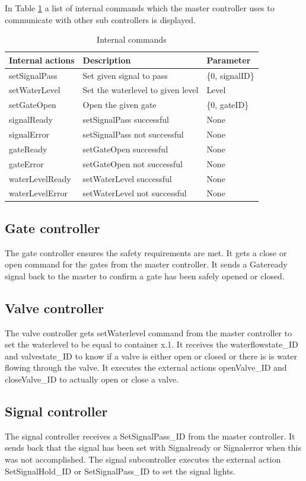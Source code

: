 \noindent In Table \ref{tab:internal} a list of internal commands which the master controller uses to communicate with other sub controllers is displayed.

\begin{table}[htbp]
	\centering
	\begin{tabular}{lll}
		\toprule
		\textbf{Internal actions} & \textbf{Description} & \textbf{Parameter} \\
		\midrule
		setSignalPass & Set given signal to pass & \{0, signalID\} \\
		setWaterLevel & Set the waterlevel to given level & Level\\
		setGateOpen & Open the given gate & \{0, gateID\} \\
		signalReady & setSignalPass successful & None\\
		signalError & setSignalPass not successful & None \\
		gateReady & setGateOpen successful & None\\
		gateError & setGateOpen not successful & None\\
		waterLevelReady & setWaterLevel successful & None\\
		waterLevelError & setWaterLevel not successful & None\\
		\bottomrule
	\end{tabular}%
	\caption{Internal commands}
	\label{tab:internal}%
\end{table}%

\subsection{Gate controller}
The gate controller ensures the safety requirements are met. It gets a close or open command for the gates from the master controller. It sends a Gateready signal back to the master to confirm a gate has been safely opened or closed. 
\subsection{Valve controller}
The valve controller gets setWaterlevel command from the master controller to set the waterlevel to be equal to container x.1. It receives the waterflowstate\_ID and valvestate\_ID to know if a valve is either open or closed or there is is water flowing through the valve. It executes the external actions openValve\_ID and closeValve\_ID to actually open or close a valve.  
\subsection{Signal controller}
The signal controller receives a SetSignalPass\_ID from the master controller. It sends back that the signal has been set with Signalready or Signalerror when this was not accomplished. The signal subcontroller executes the external action SetSignalHold\_ID or SetSignalPass\_ID to set the signal lights. 

